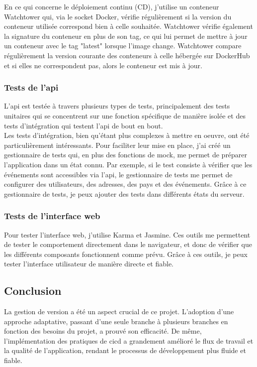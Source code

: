En ce qui concerne le déploiement continu (CD), j'utilise un conteneur Watchtower qui, via le socket Docker, vérifie régulièrement si la version du conteneur utilisée correspond bien à celle souhaitée.
Watchtower vérifie également la signature du conteneur en plus de son tag, ce qui lui permet de mettre à jour un conteneur avec le tag "latest" lorsque l'image change.
Watchtower compare régulièrement la version courante des conteneurs à celle hébergée sur DockerHub et si elles ne correspondent pas, alors le conteneur est mis à jour.

\subsubsection{Tests de l'\Gls{api}}
L'\Gls{api} est testée à travers plusieurs types de tests, principalement des tests unitaires qui se concentrent sur une fonction
spécifique de manière isolée et des tests d'intégration qui testent l'\Gls{api} de bout en bout.\\

Les tests d'intégration, bien qu'étant plus complexes à mettre en oeuvre, ont été particulièrement intéressants.
Pour faciliter leur mise en place, j'ai créé un gestionnaire de tests qui, en plus des fonctions de mock, me permet de préparer l'application dans un état connu.
Par exemple, si le test consiste à vérifier que les événements sont accessibles via l'\Gls{api}, le gestionnaire de tests me permet de configurer des utilisateurs, des adresses, des pays et des événements.
Grâce à ce gestionnaire de tests, je peux ajouter des tests dans différents états du serveur.

\subsubsection{Tests de l'interface web}
Pour tester l'interface web, j'utilise Karma et Jasmine.
Ces outils me permettent de tester le comportement directement dans le navigateur, et donc de vérifier que les différents composants fonctionnent comme prévu.
Grâce à ces outils, je peux tester l'interface utilisateur de manière directe et fiable.

\subsection{Conclusion}\label{subsec:conclusion}

La gestion de version a été un aspect crucial de ce projet.
L'adoption d'une approche adaptative, passant d'une seule branche à plusieurs branches en fonction des besoins du projet, a prouvé son efficacité.
De même, l'implémentation des pratiques de \Gls{cicd} a grandement amélioré le flux de travail et la qualité de l'application, rendant le processus de développement plus fluide et fiable.